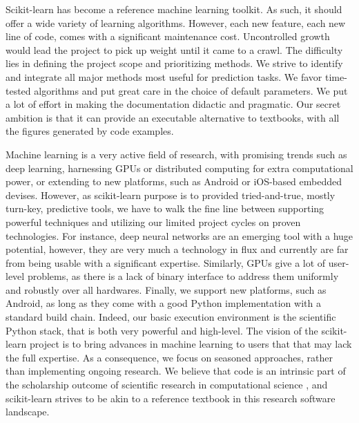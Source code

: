 \documentclass[a4paper]{article}
\begin{document}
Scikit-learn has become a reference machine learning toolkit. As such, it
should offer a wide variety of learning algorithms. However, each new
feature, each new line of code, comes with a significant maintenance cost.
Uncontrolled growth would lead the project to pick up weight until it
came to a crawl. The difficulty lies in defining the project scope and
prioritizing methods. We strive to identify and integrate all major
methods most useful for prediction tasks. We favor time-tested
algorithms and put great care in the choice of default parameters. We put
a lot of effort in making the documentation didactic and
pragmatic. Our
secret ambition is that it can provide an executable alternative to
textbooks, with all the figures generated by code examples.

Machine learning is a very active field of research, with promising
trends such as deep learning, harnessing GPUs or distributed computing
for extra computational power, or extending to new platforms, such as
Android or iOS-based embedded devises. However, as scikit-learn purpose
is to provided tried-and-true, mostly turn-key, predictive tools, we have
to walk the fine line between supporting powerful techniques and
utilizing our limited project cycles on proven technologies. For
instance, deep neural networks are an emerging tool with a huge
potential, however, they are very much a technology in flux and currently
are far from being usable with a significant expertise. Similarly, GPUs
give a lot of user-level problems, as there is a lack of binary interface
to address them uniformly and robustly over all hardwares. Finally, we
support new platforms, such as Android, as long as they come with a good
Python implementation with a standard build chain. Indeed, our basic
execution environment is the scientific Python stack, that is both very
powerful and high-level. The vision of the scikit-learn project is to
bring advances in machine learning to users that that may lack the full
expertise. As a consequence, we focus on seasoned approaches, rather than
implementing ongoing research. We believe that code is an intrinsic part
of the scholarship outcome of scientific research in computational
science \cite{buckheit1995wavelab}, and scikit-learn strives to be akin
to a reference textbook in this research software landscape.





\end{document}
